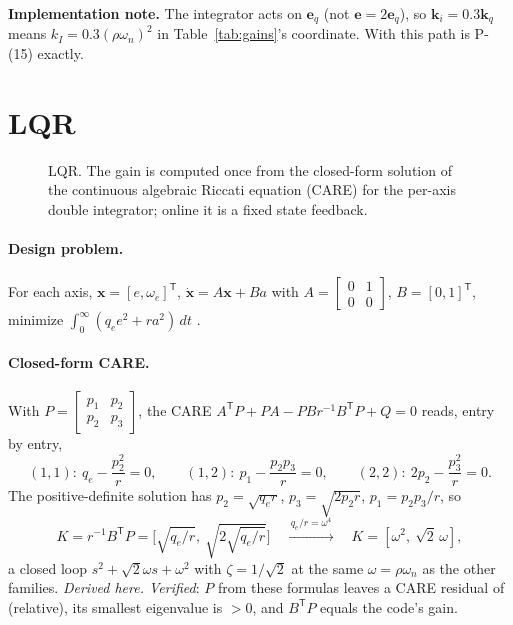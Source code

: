 \documentclass[11pt]{article}
\newcommand{\T}{^{\mathsf T}}
\newcommand{\Peq}[1]{P-(#1)}
\newcommand{\code}[1]{\path{#1}}
\theoremstyle{remark}
\newcommand{\implnote}[1]{\par\smallskip\noindent\colorbox{notebg}{\parbox{\dimexpr\linewidth-2\fboxsep}{\small\textbf{Implementation note.} #1}}\par\smallskip}
\newcommand{\archfig}[3]{%
  \begin{figure}[H]\centering\resizebox{\textwidth}{!}{}\caption{#2}\label{#3}\end{figure}}
\begin{document}
\implnote{The integrator acts on $\bm e_q$ (not $\bm e=2\bm e_q$), so $\bm k_i=0.3\bm k_q$ means
$k_I=0.3(\rho\omega_n)^2$ in Table~\ref{tab:gains}'s coordinate. With \code{--ki-factor 0} this path is \Peq{15} exactly.}

\section{LQR}\label{sec:lqr}
\archfig{fig_lqr.tex}{LQR. The gain is computed once from the closed-form solution of the continuous algebraic Riccati
equation (CARE) for the per-axis double integrator; online it is a fixed state feedback.}{fig:lqr}

\paragraph{Design problem.} For each axis, $\bm x=[e,\omega_e]\T$, $\dot{\bm x}=A\bm x+Ba$ with
$A=\left[\begin{smallmatrix}0&1\\0&0\end{smallmatrix}\right]$, $B=[0,1]\T$, minimize
$\int_0^\infty(q_e e^2+ra^2)\,dt$ \cite{andersonmoore1990optimal}.

\paragraph{Closed-form CARE.} With $P=\left[\begin{smallmatrix}p_1&p_2\\p_2&p_3\end{smallmatrix}\right]$, the CARE
$A\T P+PA-PBr^{-1}B\T P+Q=0$ reads, entry by entry,
\[
(1,1):\ q_e-\frac{p_2^2}{r}=0,\qquad (1,2):\ p_1-\frac{p_2p_3}{r}=0,\qquad (2,2):\ 2p_2-\frac{p_3^2}{r}=0 .
\]
The positive-definite solution has $p_2=\sqrt{q_er}$, $p_3=\sqrt{2p_2r}$, $p_1=p_2p_3/r$, so
\begin{equation}
K=r^{-1}B\T P=\Big[\sqrt{q_e/r},\ \sqrt{2\sqrt{q_e/r}}\Big]\quad\xrightarrow{\ q_e/r=\omega^4\ }\quad K=[\omega^2,\ \sqrt2\,\omega],
\label{eq:lqr}
\end{equation}
a closed loop $s^2+\sqrt2\omega s+\omega^2$ with $\zeta=1/\sqrt2$ at the same $\omega=\rho\omega_n$ as the other families.
\emph{Derived here. Verified}: $P$ from these formulas leaves a CARE residual of \flqrCareRelErr{} (relative), its smallest
eigenvalue is \flqrPminEig{} $>0$, and $B\T P$ equals the code's gain.
\end{document}
